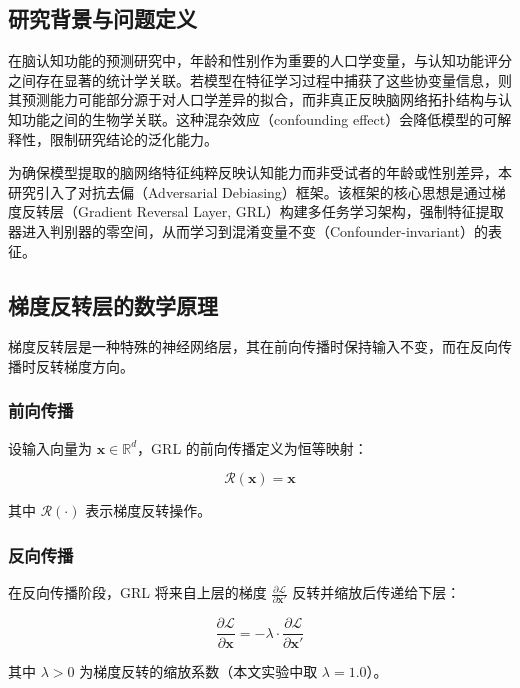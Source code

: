 \subsection{研究背景与问题定义}

在脑认知功能的预测研究中，年龄和性别作为重要的人口学变量，与认知功能评分之间存在显著的统计学关联。若模型在特征学习过程中捕获了这些协变量信息，则其预测能力可能部分源于对人口学差异的拟合，而非真正反映脑网络拓扑结构与认知功能之间的生物学关联。这种混杂效应（confounding effect）会降低模型的可解释性，限制研究结论的泛化能力。

为确保模型提取的脑网络特征纯粹反映认知能力而非受试者的年龄或性别差异，本研究引入了对抗去偏（Adversarial Debiasing）框架。该框架的核心思想是通过梯度反转层（Gradient Reversal Layer, GRL）构建多任务学习架构，强制特征提取器进入判别器的零空间，从而学习到混淆变量不变（Confounder-invariant）的表征。

\subsection{梯度反转层的数学原理}

梯度反转层是一种特殊的神经网络层，其在前向传播时保持输入不变，而在反向传播时反转梯度方向。

\subsubsection{前向传播}

设输入向量为 $\mathbf{x} \in \mathbb{R}^d$，GRL 的前向传播定义为恒等映射：

\begin{equation}
\mathcal{R}(\mathbf{x}) = \mathbf{x}
\end{equation}

其中 $\mathcal{R}(\cdot)$ 表示梯度反转操作。

\subsubsection{反向传播}

在反向传播阶段，GRL 将来自上层的梯度 $\frac{\partial \mathcal{L}}{\partial \mathbf{x}'}$ 反转并缩放后传递给下层：

\begin{equation}
\frac{\partial \mathcal{L}}{\partial \mathbf{x}} = -\lambda \cdot \frac{\partial \mathcal{L}}{\partial \mathbf{x}'}
\end{equation}

其中 $\lambda > 0$ 为梯度反转的缩放系数（本文实验中取 $\lambda = 1.0$）。

